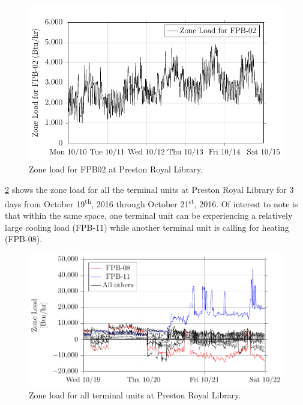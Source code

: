 \begin{figure}
\centering
\includegraphics{Plots/2017-04-03-1250-ZoneLoadforFPB02-TikzData.pdf}
\caption{Zone load for FPB02 at Preston Royal Library.}
\label{fig:2017-04-03-1250-ZoneLoadforFPB02-TikzData}
\end{figure}


\figref{} \ref{fig:2017-06-05-0822-ZoneLoadforFPB02-TikzData} shows     
the zone load for all the terminal units at Preston Royal Library       
for 3 days from October 19\textsuperscript{th}, 2016 through October    
21\textsuperscript{st}, 2016. Of interest to note is that within the    
same space, one terminal unit can be experiencing a relatively large    
cooling load (FPB-11) while another terminal unit is calling for        
heating (FPB-08).                                                       


\begin{figure}
\centering
\includegraphics{Plots/2017-06-05-0822-ZoneLoadforFPB02-TikzData.pdf}
\caption{Zone load for all terminal units at Preston Royal Library.}
\label{fig:2017-06-05-0822-ZoneLoadforFPB02-TikzData}
\end{figure}



